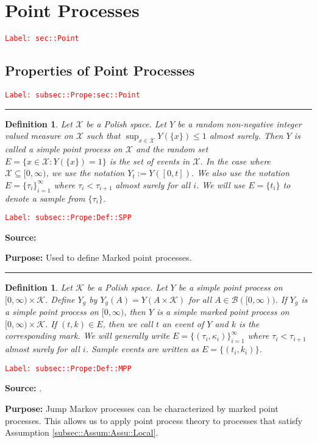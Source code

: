\documentclass[12pt]{article}
\newcommand{\mc}{\mathcal}
\newcommand{\ms}{\mathscr}
\newcommand{\tr}{\textcolor{red}}
\newcommand{\labe}[1]{\tr{\texttt{Label: #1}}}
\newcommand{\purpose}{\textbf{Purpose: }}
\newcommand{\lin}{\rule{\linewidth}{0.4 pt}}
\newtheorem{defn}[thms]{Definition}
\begin{document}
\section{Point Processes}
\label{sec::Point}\labe{sec::Point}

\subsection{Properties of Point Processes}
\label{subsec::Prope:sec::Point}\labe{subsec::Prope:sec::Point}

\lin

\begin{defn}
Let \(\mc{X}\) be a Polish space. Let \(Y\) be a random non-negative integer valued measure on \(\mc{X}\) such that \(\sup_{x \in \mc{X}} Y(\{x\})\leq 1\) almost surely. Then \(Y\) is called a simple point process on \(\mc{X}\) and the random set \(E = \{x \in \mc{X}: Y(\{x\}) = 1\}\) is the set of events in \(\mc{X}\). In the case where \(\mc{X} \subseteq [0,\infty)\), we use the notation \(Y_t := Y([0,t])\). We also use the notation \(E = \{\tau_i\}_{i=1}^{\infty}\) where \(\tau_i < \tau_{i+1}\) almost surely for all \(i\). We will use \(E = \{t_i\}\) to denote a sample from \(\{\tau_i\}\).
\label{subsec::Prope:Def::SPP}
\end{defn}
\labe{subsec::Prope:Def::SPP}

\textbf{Source: }\cite[Definition 9.1.II]{DalVer08}

\purpose Used to define Marked point processes.

\lin

\begin{defn}
Let \(\mc{K}\) be a Polish space. Let \(Y\) be a simple point process on \([0,\infty)\times \mc{K}\). Define \(Y_g\) by \(Y_g(A) = Y(A\times \mc{K})\) for all \(A \in \ms{B}([0,\infty))\). If \(Y_g\) is a simple point process on \([0,\infty)\), then \(Y\) is a simple marked point process on \([0,\infty)\times \mc{K}\). If \((t,k) \in E\), then we call \(t\) an event of \(Y\) and \(k\) is the corresponding mark. We will generally write \(E = \{(\tau_i,\kappa_i)\}_{i=1}^{\infty}\) where \(\tau_i < \tau_{i+1}\) almost surely for all \(i\). Sample events are written as \(E = \{(t_i,k_i)\}\). 
\label{subsec::Prope:Def::MPP}
\end{defn}
\labe{subsec::Prope:Def::MPP}

\textbf{Source: }\cite[Definition 6.4.I]{DalVer03}.

\purpose Jump Markov processes can be characterized by marked point processes. This allows us to apply point process theory to processes that satisfy Assumption \ref{subsec::Assum:Assu::Local}.
\end{document}
